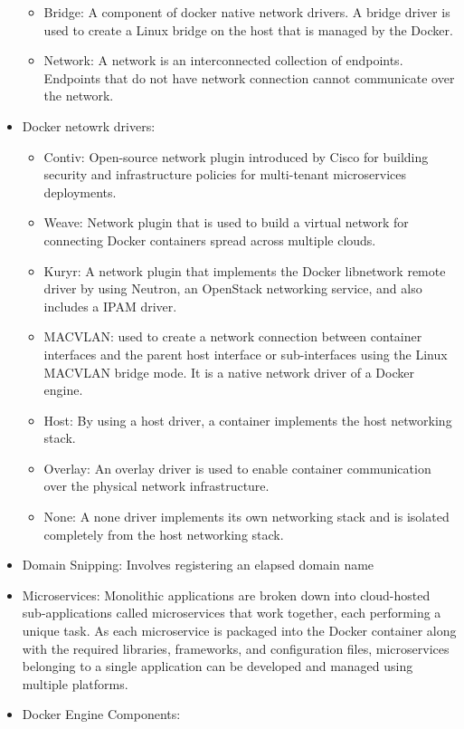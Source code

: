 \begin{itemize}
\begin{itemize}
        \item Bridge: A component of docker native network drivers. A bridge driver is used to create a Linux bridge on the host that is managed by the Docker.
        \item Network: A network is an interconnected collection of endpoints. Endpoints that do not have network connection cannot communicate over the network.
    \end{itemize}
    \item Docker netowrk drivers:
    \begin{itemize}
        \item Contiv: Open-source network plugin introduced by Cisco for building security and infrastructure policies for multi-tenant microservices deployments.
        \item Weave: Network plugin that is used to build a virtual network for connecting Docker containers spread across multiple clouds.
        \item Kuryr: A network plugin that implements the Docker libnetwork remote driver by using Neutron, an OpenStack networking service, and also includes a IPAM driver.
        \item MACVLAN: used to create a network connection between container interfaces and the parent host interface or sub-interfaces using the Linux MACVLAN bridge mode. It is a native network driver of a Docker engine.
        \item Host: By using a host driver, a container implements the host networking stack.
        \item Overlay: An overlay driver is used to enable container communication over the physical network infrastructure.
        \item None: A none driver implements its own networking stack and is isolated completely from the host networking stack.
    \end{itemize}
    \item Domain Snipping: Involves registering an elapsed domain name
    \item Microservices: Monolithic applications are broken down into cloud-hosted sub-applications called microservices that work together, each performing a unique task. As each microservice is packaged into the Docker container along with the required libraries, frameworks, and configuration files, microservices belonging to a single application can be developed and managed using multiple platforms.
    \item Docker Engine Components:

\end{itemize}

